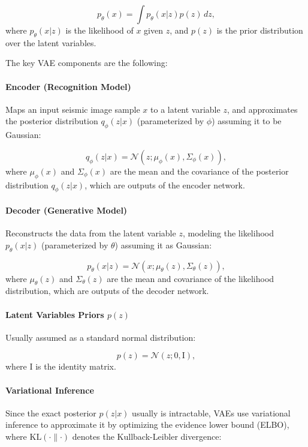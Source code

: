 \documentclass{ieeeaccess}
\begin{document}
\begin{equation}
p_\theta(x) = \int p_\theta(x | z) p(z) \, dz,
\end{equation}
where $p_\theta(x | z)$ is the likelihood of $x$ given $z$, and $p(z)$ is the prior distribution over the latent variables.


The key VAE components are the following:

\paragraph{Encoder (Recognition Model)}
Maps an input seismic image sample $x$ to a latent variable $z$, and approximates the posterior distribution $q_\phi(z | x)$ (parameterized by $\phi$) assuming it to be Gaussian:

\begin{equation}
q_\phi(z | x) = \mathcal{N}(z; \mu_\phi(x), \Sigma_\phi(x)),
\end{equation}
where $\mu_\phi(x)$ and $\Sigma_\phi(x)$ are the mean and the covariance of the posterior distribution $q_\phi(z | x)$, which are outputs of the encoder network.

\paragraph{Decoder (Generative Model)}
Reconstructs the data from the latent variable $z$, modeling the likelihood $p_\theta(x | z)$ (parameterized by $\theta$) assuming it as Gaussian:

\begin{equation}
p_\theta(x | z) = \mathcal{N}(x; \mu_\theta(z), \Sigma_\theta(z)),
\end{equation}
where $\mu_\theta(z)$ and $\Sigma_\theta(z)$ are the mean and covariance of the likelihood distribution, which are outputs of the decoder network.

\paragraph{Latent Variables Priors $p(z)$}
Usually assumed as a standard normal distribution:

\begin{equation}
p(z) = \mathcal{N}(z; 0, \mathrm{I}),
\end{equation}
where $\mathrm{I}$ is the identity matrix.

\paragraph{Variational Inference} 
Since the exact posterior $p(z | x)$ usually is intractable, VAEs use variational inference to approximate it by optimizing the evidence lower bound (ELBO), where $\text{KL}(\cdot \parallel \cdot)$ denotes the Kullback-Leibler divergence:
\end{document}
